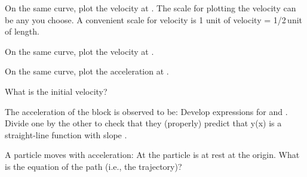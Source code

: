 {\begin{two-digit-list}
\begin{one-digit-list}
 \item [b.] On the same curve, plot the velocity at .
 The scale for plotting the velocity can be any you choose.
 A convenient scale for velocity is 1 unit of velocity = 1/2\,unit of length.
 \item [c.] On the same curve, plot the velocity at . 
 \item [d.] On the same curve, plot the acceleration at . 
 \end{one-digit-list}
%

\item [13.] 
\begin{one-digit-list}
\item [a.] What is the initial velocity?
\item [b.] The acceleration of the block is observed to be:
%
%
Develop expressions for  and .
Divide one by the other to check that they (properly) predict that y(x) is a
straight-line function with slope \m{\tan\theta}.
\end{one-digit-list}

\item [14.] A particle moves with acceleration:
%
%
At  the particle is at rest at the origin.
What is the equation of the path (i.e., the trajectory)?


\end{two-digit-list}}
